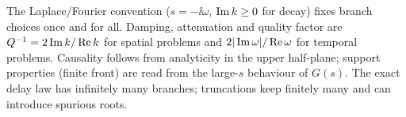 \begin{summarybox}[Summary]
The Laplace/Fourier convention ($s=-\ii\omega$, $\operatorname{Im} k\ge0$ for decay) fixes branch choices once and for all. Damping, attenuation and quality factor are $Q^{-1}=2\operatorname{Im} k/\operatorname{Re} k$ for spatial problems and $2|\operatorname{Im}\omega|/\operatorname{Re}\omega$ for temporal problems. Causality follows from analyticity in the upper half-plane; support properties (finite front) are read from the large-$s$ behaviour of $G(s)$. The exact delay law has infinitely many branches; truncations keep finitely many and can introduce spurious roots.
\end{summarybox}
